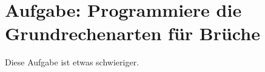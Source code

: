 \section{Aufgabe: Programmiere die Grundrechenarten für Brüche}

Diese Aufgabe ist etwas schwieriger.